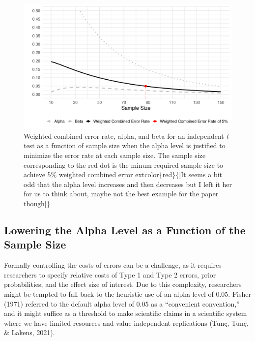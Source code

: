 \documentclass[
  english,
  ,jou, a4paper,floatsintext]{apa6}
\begin{document}
\begin{figure}
\centering
\includegraphics{Justify_in_Practice_files/figure-latex/error-plot-1.pdf}
\caption{\label{fig:error-plot}Weighted combined error rate, alpha, and beta for an independent \emph{t}-test as a function of sample size when the alpha level is justified to minimize the error rate at each sample size. The sample size corresponding to the red dot is the minum required sample size to achieve 5\% weighted combined error extcolor\{red\}\{{[}It seems a bit odd that the alpha level increases and then decreases but I left it her for us to think about, maybe not the best example for the paper though{]}\}}
\end{figure}

\hypertarget{lowering-the-alpha-level-as-a-function-of-the-sample-size}{%
\subsection{Lowering the Alpha Level as a Function of the Sample Size}\label{lowering-the-alpha-level-as-a-function-of-the-sample-size}}

Formally controlling the costs of errors can be a challenge, as it requires researchers to specify relative costs of Type 1 and Type 2 errors, prior probabilities, and the effect size of interest. Due to this complexity, researchers might be tempted to fall back to the heuristic use of an alpha level of 0.05. Fisher (1971) referred to the default alpha level of 0.05 as a ``convenient convention,'' and it might suffice as a threshold to make scientific claims in a scientific system where we have limited resources and value independent replications (Tunç, Tunç, \& Lakens, 2021).
\end{document}
